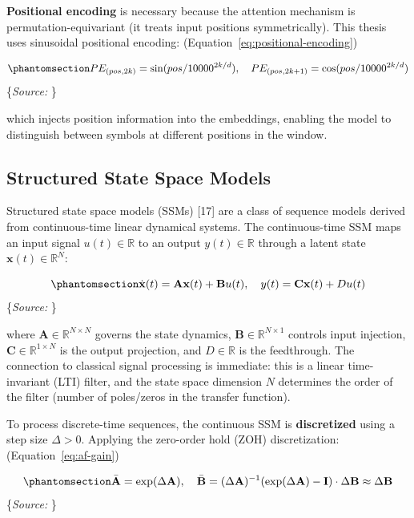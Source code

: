 \documentclass[
  english,
  12pt,
  12pt,
  a4paper,
  oneside]{report}
\begin{document}
\textbf{Positional encoding} is necessary because the attention mechanism is permutation-equivariant (it treats input positions symmetrically). This thesis uses sinusoidal positional encoding: (Equation~\ref{eq:positional-encoding})

\begin{equation}\protect\phantomsection\label{eq:positional-encoding}{PE_{(pos, 2k)} = \sin(pos / 10000^{2k/d}), \quad PE_{(pos, 2k+1)} = \cos(pos / 10000^{2k/d})
}\end{equation} \footnotesize\{\textit{Source: \1}\}\normalsize

which injects position information into the embeddings, enabling the model to distinguish between symbols at different positions in the window.

\subsection{Structured State Space Models}\label{sec:structured-state-space-models}

Structured state space models (SSMs) {[}17{]} are a class of sequence models derived from continuous-time linear dynamical systems. The continuous-time SSM maps an input signal \(u(t) \in \mathbb{R}\) to an output \(y(t) \in \mathbb{R}\) through a latent state \(\mathbf{x}(t) \in \mathbb{R}^N\):

\begin{equation}\protect\phantomsection\label{eq:ssm-continuous}{\dot{\mathbf{x}}(t) = \mathbf{A}\mathbf{x}(t) + \mathbf{B}u(t), \quad y(t) = \mathbf{C}\mathbf{x}(t) + Du(t)
}\end{equation} \footnotesize\{\textit{Source: \1}\}\normalsize

where \(\mathbf{A} \in \mathbb{R}^{N \times N}\) governs the state dynamics, \(\mathbf{B} \in \mathbb{R}^{N \times 1}\) controls input injection, \(\mathbf{C} \in \mathbb{R}^{1 \times N}\) is the output projection, and \(D \in \mathbb{R}\) is the feedthrough. The connection to classical signal processing is immediate: this is a linear time-invariant (LTI) filter, and the state space dimension \(N\) determines the order of the filter (number of poles/zeros in the transfer function).

To process discrete-time sequences, the continuous SSM is \textbf{discretized} using a step size \(\Delta > 0\). Applying the zero-order hold (ZOH) discretization: (Equation~\ref{eq:af-gain})

\begin{equation}\protect\phantomsection\label{eq:ssm-zoh}{\bar{\mathbf{A}} = \exp(\Delta \mathbf{A}), \quad \bar{\mathbf{B}} = (\Delta \mathbf{A})^{-1}(\exp(\Delta \mathbf{A}) - \mathbf{I}) \cdot \Delta \mathbf{B} \approx \Delta \mathbf{B}
}\end{equation} \footnotesize\{\textit{Source: \1}\}\normalsize
\end{document}
